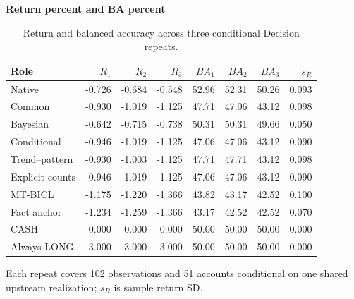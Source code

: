 \begin{table}[htb]
\centering\small
\setlength{\tabcolsep}{3pt}
\renewcommand{\arraystretch}{1.12}
\caption{Return and balanced accuracy across three conditional Decision repeats.}
\label{tab:u09-repeats}
\textbf{Return percent and BA percent}\par\smallskip
\begin{tabular}{lrrrrrrr}
\hline
Role & $R_1$ & $R_2$ & $R_3$ & $BA_1$ & $BA_2$ & $BA_3$ & $s_R$ \\
\hline
Native & -0.726 & -0.684 & -0.548 & 52.96 & 52.31 & 50.26 & 0.093 \\
Common & -0.930 & -1.019 & -1.125 & 47.71 & 47.06 & 43.12 & 0.098 \\
Bayesian & -0.642 & -0.715 & -0.738 & 50.31 & 50.31 & 49.66 & 0.050 \\
Conditional & -0.946 & -1.019 & -1.125 & 47.06 & 47.06 & 43.12 & 0.090 \\
Trend--pattern & -0.930 & -1.003 & -1.125 & 47.71 & 47.71 & 43.12 & 0.098 \\
Explicit counts & -0.946 & -1.019 & -1.125 & 47.06 & 47.06 & 43.12 & 0.090 \\
MT-BICL & -1.175 & -1.220 & -1.366 & 43.82 & 43.17 & 42.52 & 0.100 \\
Fact anchor & -1.234 & -1.259 & -1.366 & 43.17 & 42.52 & 42.52 & 0.070 \\
CASH & 0.000 & 0.000 & 0.000 & 50.00 & 50.00 & 50.00 & 0.000 \\
Always-LONG & -3.000 & -3.000 & -3.000 & 50.00 & 50.00 & 50.00 & 0.000 \\
\hline
\end{tabular}\par\medskip
\begin{minipage}{\textwidth}\footnotesize Each repeat covers 102 observations and 51 accounts conditional on one shared upstream realization; $s_R$ is sample return SD.\end{minipage}
\end{table}
